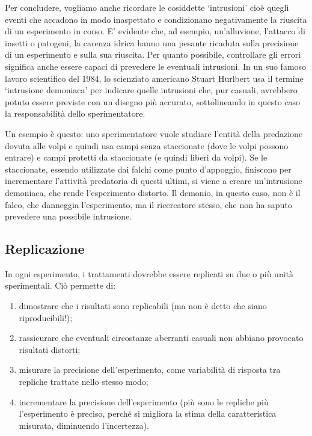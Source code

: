 \documentclass[a4paper,12pt,oneside]{book}
\providecommand{\tightlist}{%
  \setlength{\itemsep}{0pt}\setlength{\parskip}{0pt}}
\begin{document}
Per concludere, vogliamo anche ricordare le cosiddette `intrusioni' cioè quegli eventi che accadono in modo inaspettato e condizionano negativamente la riuscita di un esperimento in corso. E' evidente che, ad esempio, un'alluvione, l'attacco di insetti o patogeni, la carenza idrica hanno una pesante ricaduta sulla precisione di un esperimento e sulla sua riuscita. Per quanto possibile, controllare gli errori significa anche essere capaci di prevedere le eventuali intrusioni. In un suo famoso lavoro scientifico del 1984, lo scienziato americano Stuart Hurlbert usa il termine `intrusione demoniaca' per indicare quelle intrusioni che, pur casuali, avrebbero potuto essere previste con un disegno più accurato, sottolineando in questo caso la responsabilità dello sperimentatore.

Un esempio è questo: uno sperimentatore vuole studiare l'entità della predazione dovuta alle volpi e quindi usa campi senza staccionate (dove le volpi possono entrare) e campi protetti da staccionate (e quindi liberi da volpi). Se le staccionate, essendo utilizzate dai falchi come punto d'appoggio, finiscono per incrementare l'attività predatoria di questi ultimi, si viene a creare un'intrusione demoniaca, che rende l'esperimento distorto. Il demonio, in questo caso, non è il falco, che danneggia l'esperimento, ma il ricercatore stesso, che non ha saputo prevedere una possibile intrusione.

\hypertarget{replicazione}{%
\subsection{Replicazione}\label{replicazione}}

In ogni esperimento, i trattamenti dovrebbe essere replicati su due o più unità sperimentali. Ciò permette di:

\begin{enumerate}
\def\labelenumi{\arabic{enumi}.}
\tightlist
\item
  dimostrare che i risultati sono replicabili (ma non è detto che siano riproducibili!);
\item
  rassicurare che eventuali circostanze aberranti casuali non abbiano provocato risultati distorti;
\item
  misurare la precisione dell'esperimento, come variabilità di risposta tra repliche trattate nello stesso modo;
\item
  incrementare la precisione dell'esperimento (più sono le repliche più l'esperimento è preciso, perché si migliora la stima della caratteristica misurata, diminuendo l'incertezza).
\end{enumerate}
\end{document}
